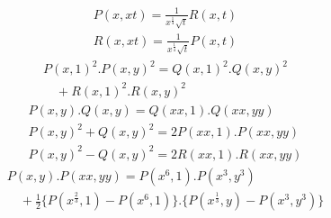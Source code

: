 

\[
\begin{gathered}
P(x,xt)=\frac{1}{x^{\frac14}\surd t}R(x,t)\\[8pt]
R(x,xt)=\frac{1}{x^{\frac14}\surd t}P(x,t)
\end{gathered}
\]
\[
\begin{gathered}P(x,1)^2.P(x,y)^2=Q(x,1)^2.Q(x,y)^2\\[8pt]\quad{}+R(x,1)^2.R(x,y)^2\end{gathered}
\]
\[
\begin{gathered}
P(x,y).Q(x,y)=Q(xx,1).Q(xx,yy)\\[8pt]
P(x,y)^2+Q(x,y)^2=2P(xx,1).P(xx,yy)\\[8pt]
P(x,y)^2-Q(x,y)^2=2R(xx,1).R(xx,yy)
\end{gathered}
\]
\[
\begin{gathered}P(x,y).P(xx,yy)=P(x^6,1).P(x^3,y^3)
\\[8pt]\quad{}+\tfrac12\{P(x^{\frac23},1)-P(x^6,1)\}.
\{P(x^{\frac13},y)-P(x^3,y^3)\}\end{gathered}
\]

\clearpage
\endgroup
